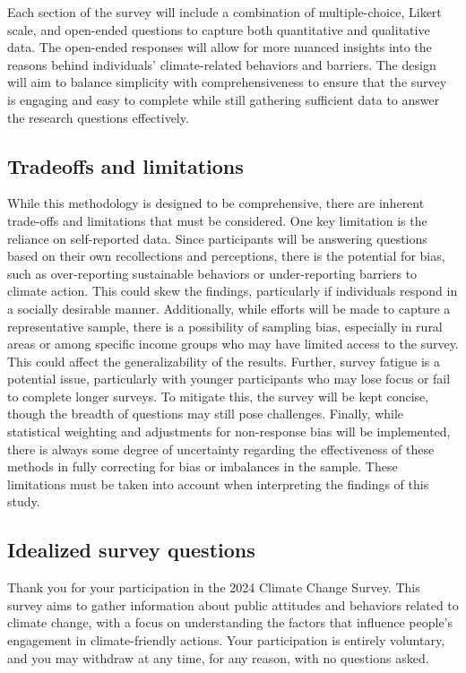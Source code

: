 \documentclass[
  letterpaper,
  DIV=11,
  numbers=noendperiod]{scrartcl}
\begin{document}
Each section of the survey will include a combination of
multiple-choice, Likert scale, and open-ended questions to capture both
quantitative and qualitative data. The open-ended responses will allow
for more nuanced insights into the reasons behind individuals'
climate-related behaviors and barriers. The design will aim to balance
simplicity with comprehensiveness to ensure that the survey is engaging
and easy to complete while still gathering sufficient data to answer the
research questions effectively.

\subsection{Tradeoffs and limitations}\label{tradeoffs-and-limitations}

While this methodology is designed to be comprehensive, there are
inherent trade-offs and limitations that must be considered. One key
limitation is the reliance on self-reported data. Since participants
will be answering questions based on their own recollections and
perceptions, there is the potential for bias, such as over-reporting
sustainable behaviors or under-reporting barriers to climate action.
This could skew the findings, particularly if individuals respond in a
socially desirable manner. Additionally, while efforts will be made to
capture a representative sample, there is a possibility of sampling
bias, especially in rural areas or among specific income groups who may
have limited access to the survey. This could affect the
generalizability of the results. Further, survey fatigue is a potential
issue, particularly with younger participants who may lose focus or fail
to complete longer surveys. To mitigate this, the survey will be kept
concise, though the breadth of questions may still pose challenges.
Finally, while statistical weighting and adjustments for non-response
bias will be implemented, there is always some degree of uncertainty
regarding the effectiveness of these methods in fully correcting for
bias or imbalances in the sample. These limitations must be taken into
account when interpreting the findings of this study.

\subsection{Idealized survey
questions}\label{idealized-survey-questions}

Thank you for your participation in the 2024 Climate Change Survey. This
survey aims to gather information about public attitudes and behaviors
related to climate change, with a focus on understanding the factors
that influence people's engagement in climate-friendly actions. Your
participation is entirely voluntary, and you may withdraw at any time,
for any reason, with no questions asked.
\end{document}
